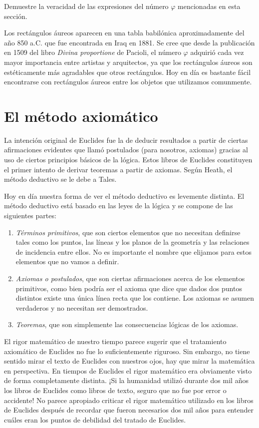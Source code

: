 \begin{exercise}
	Demuestre la veracidad de las expresiones del número $\varphi$ mencionadas
	en esta sección. 
\end{exercise}

Los rectángulos áureos aparecen en una tabla babilónica aproximadamente del año
850 a.C. que fue encontrada en Iraq en 1881. Se cree que desde la publicación
en 1509 del libro \emph{Divina proportione} de Pacioli, el número $\varphi$
adquirió cada vez mayor importancia entre artistas y arquitectos, ya que los
rectángulos áureos son estéticamente más agradables que otros rectángulos. Hoy
en día es bastante fácil encontrarse con rectángulos áureos entre los objetos
que utilizamos comunmente. 

\section*{El método axiomático}

La intención original de Euclides fue la de deducir resultados a partir de
ciertas afirmaciones evidentes que llamó postulados (para nosotros, axiomas)
gracias al uso de ciertos principios básicos de la lógica. Estos libros de
Euclides constituyen el primer intento de derivar teoremas a partir de axiomas.
Según Heath, el método deductivo se le debe a Tales. 

Hoy en día nuestra forma de ver el método deductivo es levemente distinta.  El
método deductivo está basado en las leyes de la lógica y se compone de las
siguientes partes:
\begin{enumerate} 
	\item \emph{Términos primitivos}, que son ciertos elementos que no necesitan
			definirse tales como los puntos, las líneas y los planos de la
			geometría y las relaciones de incidencia entre ellos. No es
			importante el nombre que elijamos para estos elementos que no vamos
			a definir. 
		\item \emph{Axiomas o postulados}, que son ciertas afirmaciones acerca
			de los elementos primitivos, como bien podría ser el axioma que
			dice que dados dos puntos distintos existe una única línea recta
			que los contiene. Los axiomas se asumen verdaderos y no necesitan
			ser demostrados. 
		\item \emph{Teoremas}, que son simplemente las consecuencias lógicas de
			los axiomas.
\end{enumerate}

El rigor matemático de nuestro tiempo parece sugerir que el tratamiento
axiomático de Euclides no fue lo suficientemente riguroso. Sin embargo, no
tiene sentido mirar el texto de Euclides con nuestros ojos, hay que mirar la
matemática en perspectiva. En tiempos de Euclides el rigor matemático era
obviamente visto de forma completamente distinta. ¡Si la humanidad utilizó
durante dos mil años los libros de Euclides como libros de texto, seguro que no
fue por error o accidente! No parece apropiado criticar el rigor matemático
utilizado en los libros de Euclides después de recordar que fueron necesarios
dos mil años para entender cuáles eran los puntos de debilidad del tratado de
Euclides.


